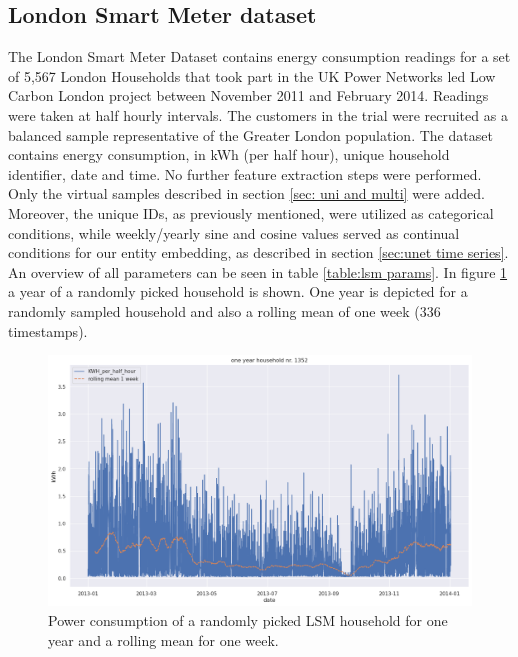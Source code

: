 \subsection*{London Smart Meter dataset}
\label{subsec:LSM}
The London Smart Meter Dataset \cite{LSMsource} contains energy consumption readings for a set of 5,567 London Households that took part in the UK Power Networks led Low Carbon London project between November 2011 and February 2014.
Readings were taken at half hourly intervals. The customers in the trial were recruited as a balanced sample representative of the Greater London population.
The dataset contains energy consumption, in kWh (per half hour), unique household identifier, date and time. No further feature extraction steps were performed. Only the virtual samples described in section \ref{sec: uni and multi} were added. Moreover, the unique IDs, as previously mentioned, were utilized as categorical conditions, while weekly/yearly sine and cosine values served as continual conditions for our entity embedding, as described in section \ref{sec:unet time series}.
An overview of all parameters can be seen in table \ref{table:lsm params}. In figure \ref{fig:one_year_lsm} a year of a randomly picked household is shown. One year is depicted for a randomly sampled household and also a rolling mean of one week (336 timestamps).\newline
\begin{figure}
    \centering
    \includegraphics[width = \textwidth]{images/one_year_rm_lsm1357.png}
    \caption{Power consumption of a randomly picked LSM household for one year and a rolling mean for one week.}
    \label{fig:one_year_lsm}
\end{figure}
